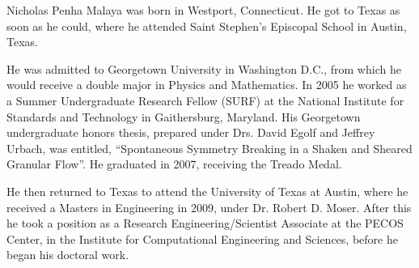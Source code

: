 
Nicholas Penha Malaya was born in Westport, Connecticut. He got to Texas
as soon as he could, where he attended Saint Stephen's Episcopal School in
Austin, Texas. 

He was admitted to Georgetown University in Washington D.C., from
which he would receive a double major in Physics and Mathematics. In
2005 he worked as a Summer Undergraduate Research Fellow (SURF) at the
National Institute for Standards and Technology in Gaithersburg,
Maryland. His Georgetown undergraduate honors thesis, prepared under
Drs\@. David Egolf and Jeffrey Urbach, was entitled, ``Spontaneous
Symmetry Breaking in a Shaken and Sheared Granular Flow''. He graduated
in 2007, receiving the Treado Medal.   

He then returned to Texas to attend the University of Texas at
Austin, where he received a Masters in Engineering in 2009, under
Dr\@. Robert D. Moser. After this he took a position as a Research
Engineering/Scientist Associate at the PECOS Center, in the Institute
for Computational Engineering and Sciences, before he began his
doctoral work. 


